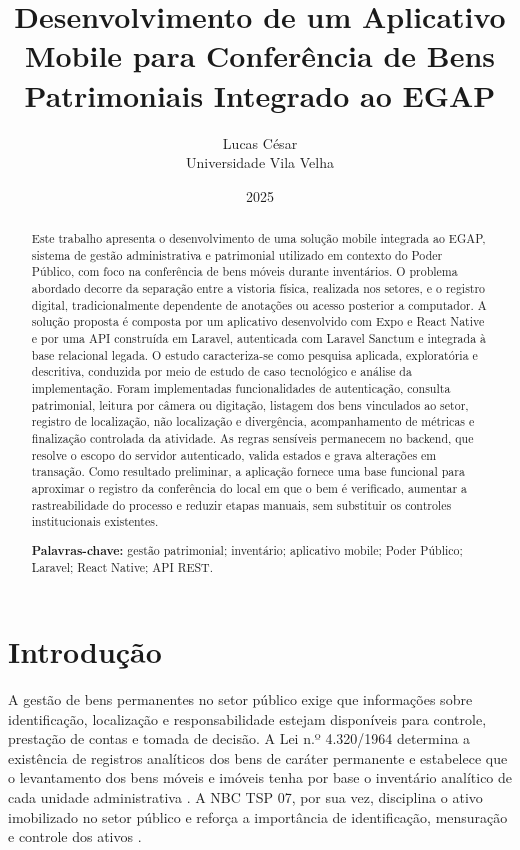 \documentclass[12pt,a4paper]{article}
\title{\textbf{Desenvolvimento de um Aplicativo Mobile para Conferência de Bens Patrimoniais Integrado ao EGAP}}
\author{Lucas César\\Universidade Vila Velha}
\date{2025}
\begin{document}
\maketitle

\begin{abstract}
Este trabalho apresenta o desenvolvimento de uma solução mobile integrada ao
EGAP, sistema de gestão administrativa e patrimonial utilizado em contexto do
Poder Público, com foco na conferência de bens móveis durante inventários. O
problema abordado decorre da separação entre a vistoria física, realizada nos
setores, e o registro digital, tradicionalmente dependente de anotações ou
acesso posterior a computador. A solução proposta é composta por um aplicativo
desenvolvido com Expo e React Native e por uma API construída em Laravel,
autenticada com Laravel Sanctum e integrada à base relacional legada. O estudo
caracteriza-se como pesquisa aplicada, exploratória e descritiva, conduzida por
meio de estudo de caso tecnológico e análise da implementação. Foram
implementadas funcionalidades de autenticação, consulta patrimonial, leitura
por câmera ou digitação, listagem dos bens vinculados ao setor, registro de
localização, não localização e divergência, acompanhamento de métricas e
finalização controlada da atividade. As regras sensíveis permanecem no
backend, que resolve o escopo do servidor autenticado, valida estados e grava
alterações em transação. Como resultado preliminar, a aplicação fornece uma
base funcional para aproximar o registro da conferência do local em que o bem
é verificado, aumentar a rastreabilidade do processo e reduzir etapas manuais,
sem substituir os controles institucionais existentes.

\noindent\textbf{Palavras-chave:} gestão patrimonial; inventário; aplicativo
mobile; Poder Público; Laravel; React Native; API REST.
\end{abstract}

\tableofcontents
\clearpage

\section{Introdução}

A gestão de bens permanentes no setor público exige que informações sobre
identificação, localização e responsabilidade estejam disponíveis para
controle, prestação de contas e tomada de decisão. A Lei n.º 4.320/1964
determina a existência de registros analíticos dos bens de caráter permanente
e estabelece que o levantamento dos bens móveis e imóveis tenha por base o
inventário analítico de cada unidade administrativa \cite{brasil4320}. A NBC
TSP 07, por sua vez, disciplina o ativo imobilizado no setor público e reforça
a importância de identificação, mensuração e controle dos ativos
\cite{cfcnbctsp07}.
\end{document}

